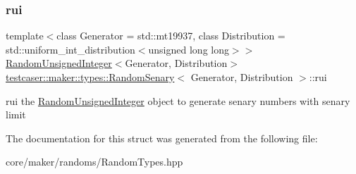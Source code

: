 \subsubsection{\texorpdfstring{rui}{rui}}
{\footnotesize\ttfamily template$<$class Generator = std\+::mt19937, class Distribution = std\+::uniform\+\_\+int\+\_\+distribution$<$unsigned long long$>$$>$ \\
\mbox{\hyperlink{classtestcaser_1_1maker_1_1types_1_1RandomUnsignedInteger}{Random\+Unsigned\+Integer}}$<$Generator, Distribution$>$ \mbox{\hyperlink{structtestcaser_1_1maker_1_1types_1_1RandomSenary}{testcaser\+::maker\+::types\+::\+Random\+Senary}}$<$ Generator, Distribution $>$\+::rui}



rui the \mbox{\hyperlink{classtestcaser_1_1maker_1_1types_1_1RandomUnsignedInteger}{Random\+Unsigned\+Integer}} object to generate senary numbers with senary limit 



The documentation for this struct was generated from the following file\+:\begin{DoxyCompactItemize}
\item 
core/maker/randoms/Random\+Types.\+hpp\end{DoxyCompactItemize}

